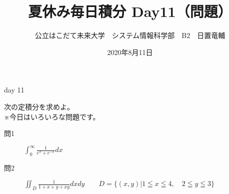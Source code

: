 \documentclass[dvipdfmx,uplatex]{jsarticle}
\title{夏休み毎日積分 Day11（問題）}
\author{公立はこだて未来大学　システム情報科学部　B2　日置竜輔}
\date{2020年8月11日}
\begin{document}
\maketitle

\begin{itembox}[c]{day 11}
    \begin{center}
        次の定積分を求めよ。\\
        ※今日はいろいろな問題です。
    \end{center}
\end{itembox}

\begin{description}
    \item [問1] $\displaystyle \int_0^\infty \frac{1}{e^x + e^{-x}} dx$
\end{description}

\begin{description}
    \item [問2] $\displaystyle \iint_D \frac{1}{1+x+y+xy}  dxdy \qquad D = \{(x,y) | 1 \leqq x \leqq 4, \quad 2 \leqq y \leqq 3\}$
\end{description}
\end{document}
